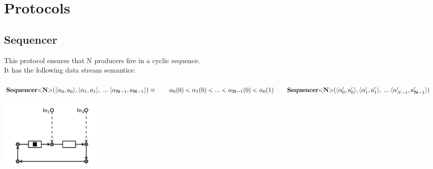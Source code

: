 \section{Protocols}
\subsection{Sequencer}%
\begin{minipage}{.65\textwidth}
  This protocol ensures that N producers fire in a cyclic sequence.\\
  It has the following data stream semantics:\\\\
  $
  \vspace{0.2cm}\sequencer (\langle \alpha_0, a_0 \rangle, \langle \alpha_1, a_1 \rangle,\;...\; \langle \alpha_{\textbf{N}-1}, a_{\textbf{N}-1} \rangle) \equiv \\
  \vspace{0.2cm}\hphantom \qquad  \alpha_0(0) < \alpha_1(0) < ... < \alpha_{\textbf{N}-1}(0) < \alpha_0(1) \\
  \hphantom \qquad \sequencer(\langle \alpha_0', a_0' \rangle, \langle \alpha_1', a_1' \rangle,\;...\; \langle \alpha_{N-1}', a_{\textbf{N}-1}' \rangle)
  $
\end{minipage}\hfill
\begin{minipage}{.25\textwidth}
  \includegraphics[width=5cm]{img/seq.png}
\end{minipage}

